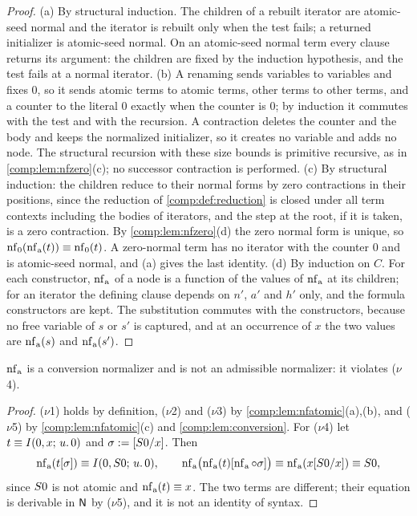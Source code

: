 \begin{proof}
(a) By structural induction. The children of a rebuilt iterator are
atomic-seed normal and the iterator is rebuilt only when the test fails; a
returned initializer is atomic-seed normal. On an atomic-seed normal term
every clause returns its argument: the children are fixed by the induction
hypothesis, and the test fails at a normal iterator.
(b) A renaming sends variables to variables and fixes $0$, so it sends
atomic terms to atomic terms, other terms to other terms, and a counter to
the literal $0$ exactly when the counter is $0$; by induction it commutes
with the test and with the recursion.
A contraction deletes the counter and the body and keeps the normalized
initializer, so it creates no variable and adds no node. The structural
recursion with these size bounds is primitive recursive, as in
\cref{comp:lem:nfzero}(c); no successor contraction is performed.
(c) By structural induction: the children reduce to their normal forms by
zero contractions in their positions, since the reduction of
\cref{comp:def:reduction} is closed under all term contexts including the
bodies of iterators, and the step at the root, if it is taken, is a zero
contraction. By \cref{comp:lem:nfzero}(d) the zero normal form is unique,
so $\operatorname{nf}_0(\operatorname{nf}_{\mathrm a}(t))\equiv\operatorname{nf}_0(t)$. A zero-normal term has no
iterator with the counter $0$ and is atomic-seed normal, and (a) gives the
last identity.
(d) By induction on $C$. For each constructor, $\operatorname{nf}_{\mathrm a}$ of a node is
a function of the values of $\operatorname{nf}_{\mathrm a}$ at its children; for an
iterator the defining clause depends on $n'$, $a'$ and $h'$ only, and the
formula constructors are kept. The substitution commutes with the
constructors, because no free variable of $s$ or $s'$ is captured, and at
an occurrence of $x$ the two values are $\operatorname{nf}_{\mathrm a}(s)$ and
$\operatorname{nf}_{\mathrm a}(s')$.
\end{proof}

\begin{proposition}
\label{comp:prop:nfatomic}
$\operatorname{nf}_{\mathrm a}$ is a conversion normalizer and is not an admissible
normalizer: it violates ($\nu$4).
\end{proposition}

\begin{proof}
($\nu$1) holds by definition, ($\nu$2) and ($\nu$3) by
\cref{comp:lem:nfatomic}(a),(b), and ($\nu$5) by
\cref{comp:lem:nfatomic}(c) and \cref{comp:lem:conversion}. For ($\nu$4) let
$t\equiv I(0,x;\,u.\,0)$ and $\sigma\mathrel{:=}[S0/x]$. Then
\[
 \operatorname{nf}_{\mathrm a}(t[\sigma])\equiv I(0,S0;\,u.\,0),
 \qquad
 \operatorname{nf}_{\mathrm a}\bigl(\operatorname{nf}_{\mathrm a}(t)[\operatorname{nf}_{\mathrm a}\circ\sigma]\bigr)
 \equiv\operatorname{nf}_{\mathrm a}(x[S0/x])\equiv S0,
\]
since $S0$ is not atomic and $\operatorname{nf}_{\mathrm a}(t)\equiv x$. The two terms
are different; their equation is derivable in $\mathsf{N}$ by ($\nu$5), and it is
not an identity of syntax.
\end{proof}

